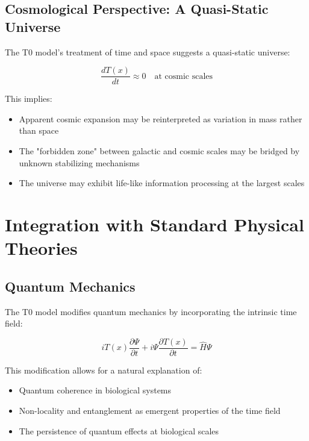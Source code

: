 \documentclass[12pt,a4paper]{article}
\newcommand{\Tfield}{T(x)}
\begin{document}
	\subsection{Cosmological Perspective: A Quasi-Static Universe}
	\label{subsec:cosmological_perspective}
	
	The T0 model's treatment of time and space suggests a quasi-static universe:
	
	\begin{equation}
		\frac{d\Tfield}{dt} \approx 0 \quad \textrm{at cosmic scales}
	\end{equation}
	
	This implies:
	
	\begin{itemize}
		\item Apparent cosmic expansion may be reinterpreted as variation in mass rather than space
		\item The "forbidden zone" between galactic and cosmic scales may be bridged by unknown stabilizing mechanisms
		\item The universe may exhibit life-like information processing at the largest scales
	\end{itemize}
	
	\section{Integration with Standard Physical Theories}
	\label{sec:integration}
	
	\subsection{Quantum Mechanics}
	\label{subsec:quantum_integration}
	
	The T0 model modifies quantum mechanics by incorporating the intrinsic time field:
	
	\begin{equation}
		i\Tfield\frac{\partial \Psi}{\partial t} + i\Psi\frac{\partial \Tfield}{\partial t} = \hat{H}\Psi
	\end{equation}
	
	This modification allows for a natural explanation of:
	
	\begin{itemize}
		\item Quantum coherence in biological systems
		\item Non-locality and entanglement as emergent properties of the time field
		\item The persistence of quantum effects at biological scales
	\end{itemize}
	
\end{document}
